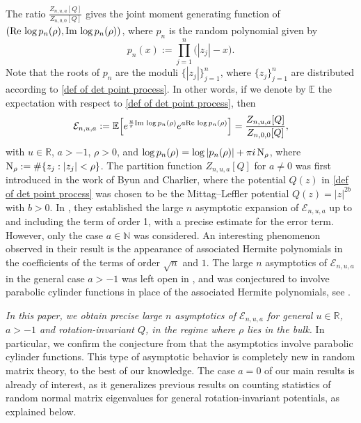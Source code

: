 \documentclass[reqno]{amsart}
\newcommand{\1}{\mathds{1}}
\newcommand{\C}{\mathds{C}}
\newcommand{\N}{\mathbb{N}}
\newcommand{\R}{\mathds{R}}
\newcommand{\re}{\text{\upshape Re\,}}
\newcommand{\im}{\text{\upshape Im\,}}
\numberwithin{equation}{section}
\theoremstyle{definition}
\begin{document}
The ratio $\frac{Z_{n,u,a}[Q]}{Z_{n,0,0}[Q]}$ gives the joint moment generating function of $(\re\log p_n(\rho),\im\log p_{n}(\rho))$, where $p_n$ is the random polynomial given by
\begin{equation}
p_n(x):=\prod_{j=1}^{n} \bigl(|z_j|-x\bigr).
\end{equation}
Note that the roots of $p_n$ are the moduli $\{|z_j|\}_{j=1}^n$, where $\{z_j\}_{j=1}^{n}$ are distributed according to \eqref{def of det point process}. In other words, if we denote by $\mathbb{E}$ the expectation with respect to \eqref{def of det point process}, then
\begin{equation}
\label{def of mathcal En}
 \mathcal{E}_{n,u,a} := \mathbb{E}\Bigl[e^{\frac{u}{\pi}\im \log p_n(\rho)}e^{a\re \log p_n(\rho)}\Bigr] = \frac{Z_{n,u,a}[Q]}{Z_{n,0,0}[Q]},
\end{equation}
with $u \in \R$, $a > -1$, $\rho >0$, and $\log p_n(\rho) = \log|p_n(\rho)| + \pi i \,\rm{N}_{\rho}$, where ${\rm N}_{\rho}:=\#\{z_j : |z_j| < \rho\}$. 
The partition function $Z_{n,u,a}[Q]$ for $a\neq 0$ was first introduced in the work \cite{BC2022} of Byun and Charlier, where the potential $Q(z)$ in \eqref{def of det point process} was chosen to be the Mittag–Leffler potential $Q(z) = |z|^{2b}$ with $b > 0$. 
In \cite[Theorem 1.1]{BC2022}, they established the large $n$ asymptotic expansion of $\mathcal{E}_{n,u,a}$ up to and including the term of order 1, with a precise estimate for the error term. However, only the case $a\in\N$ was considered. 
An interesting phenomenon observed in their result is the appearance of associated Hermite polynomials in the coefficients of the terms of order $\sqrt{n}$ and $1$. The large $n$ asymptotics of $\mathcal{E}_{n,u,a}$ in the general case $a>-1$ was left open in \cite{BC2022}, and was conjectured to involve parabolic cylinder functions in place of the associated Hermite polynomials, see \cite[Remark 1.3]{BC2022}. 

\textit{In this paper, we obtain precise large $n$ asymptotics of $\mathcal{E}_{n,u,a}$ for general $u\in\R$, $a>-1$ and rotation-invariant $Q$, in the regime where $\rho$ lies in the bulk.} In particular, we confirm the conjecture from \cite{BC2022} that the asymptotics involve parabolic cylinder functions. This type of asymptotic behavior is completely new in random matrix theory, to the best of our knowledge. The case $a=0$ of our main results is already of interest, as it generalizes previous results on counting statistics of random normal matrix eigenvalues for general rotation-invariant potentials, as explained below.
\end{document}
